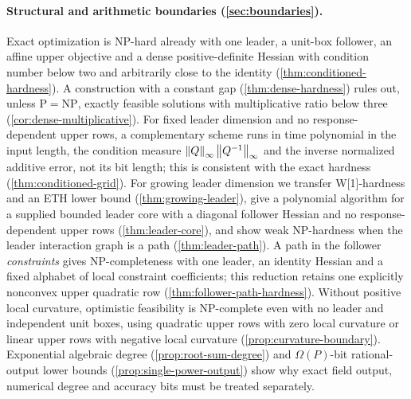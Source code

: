 \paragraph{Structural and arithmetic boundaries (\cref{sec:boundaries}).}
Exact optimization is NP-hard already with one leader, a unit-box
follower, an affine upper objective and a dense positive-definite Hessian
with condition number below two and arbitrarily close to the identity
(\cref{thm:conditioned-hardness}). A construction with a constant gap
(\cref{thm:dense-hardness}) rules out, unless $\mathrm P=\mathrm{NP}$,
exactly feasible solutions with multiplicative ratio below three
(\cref{cor:dense-multiplicative}). For fixed leader dimension and no
response-dependent upper rows, a complementary scheme runs in time
polynomial in the input length, the condition measure
$\left\lVert Q\right\rVert_\infty\left\lVert Q^{-1}\right\rVert_\infty$ and the inverse normalized additive
error, not its bit length; this is consistent with the exact hardness
(\cref{thm:conditioned-grid}). For growing leader dimension we transfer
W[1]-hardness and an ETH lower bound (\cref{thm:growing-leader}), give a
polynomial algorithm for a supplied bounded leader core with a diagonal
follower Hessian and no response-dependent upper rows
(\cref{thm:leader-core}), and show weak NP-hardness when the leader
interaction graph is a path (\cref{thm:leader-path}). A path in the
follower \emph{constraints} gives NP-completeness with one leader, an
identity Hessian and a fixed alphabet of local constraint coefficients;
this reduction retains one explicitly nonconvex upper quadratic row
(\cref{thm:follower-path-hardness}). Without positive local curvature,
optimistic feasibility is NP-complete even with no leader and independent
unit boxes, using quadratic upper rows with zero local curvature or linear
upper rows with negative local curvature (\cref{prop:curvature-boundary}).
Exponential algebraic degree (\cref{prop:root-sum-degree}) and
$\Omega(P)$-bit rational-output lower bounds (\cref{prop:single-power-output})
show why exact field output, numerical degree and accuracy bits must be
treated separately.

